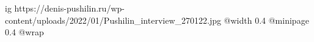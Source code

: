  
 
 
 
 

\ifcmt
  ig https://denis-pushilin.ru/wp-content/uploads/2022/01/Pushilin_interview_270122.jpg
  @width 0.4
  @minipage 0.4
  @wrap \parpic[r]
\fi
